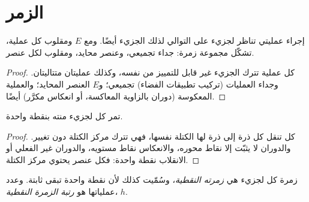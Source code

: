 \section{الزمر}

\begin{proposition}\label{prop:b3:point-groups:closure}
إجراء عمليتي تناظر لجزيء على التوالي 
لذلك الجزيء أيضًا. ومع $E$ ومقلوب
كل عملية، تشكّل مجموعة  زمرة: جداء تجميعي،
وعنصر محايد، ومقلوب لكل عنصر.
\end{proposition}

\begin{proof}
كل عملية تترك الجزيء غير قابل للتمييز من نفسه، وكذلك عمليتان
متتاليتان. وجداء العمليات (تركيب تطبيقات الفضاء)
تجميعي؛ و$E$ العنصر المحايد؛ والعملية المعكوسة (دوران بالزاوية
المعاكسة، أو انعكاس مكرَّر)  أيضًا.
\end{proof}

\begin{proposition}\label{prop:b3:point-groups:fixed-point}
تمر كل  لجزيء منته بنقطة واحدة.
\end{proposition}

\begin{proof}
كل  تنقل كل ذرة إلى ذرة لها الكتلة نفسها، فهي
تترك مركز الكتلة دون تغيير. والدوران لا يثبّت إلا نقاط
محوره، والانعكاس نقاط مستويه، والدوران غير الفعلي أو الانقلاب
نقطة واحدة: فكل عنصر يحتوي مركز الكتلة.
\end{proof}

\begin{definition}\label{def:b3:point-groups:point-group}
زمرة كل  لجزيء هي \emph{زمرته
النقطية}، وسُمّيت كذلك لأن نقطة واحدة تبقى ثابتة. وعدد
عملياتها هو \emph{رتبة الزمرة النقطية}،
$h$.
\end{definition}

